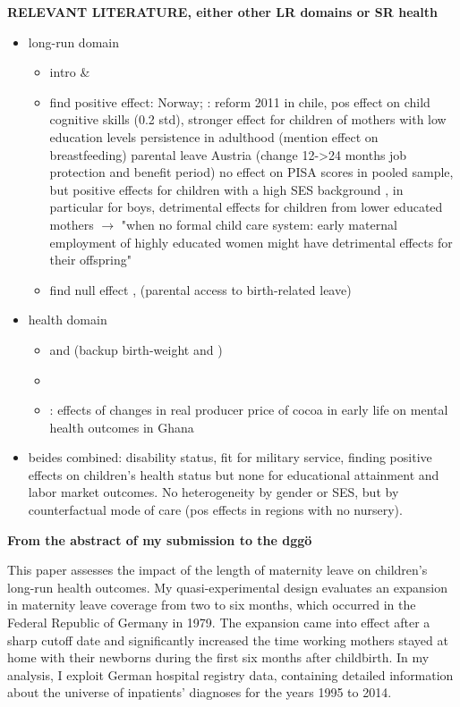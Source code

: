 \documentclass[11pt, a4paper,draft]{article} %
\begin{document}
\textbf{RELEVANT LITERATURE, either other LR domains or SR health} 
\begin{itemize}
	\item long-run domain
	\begin{itemize}
		\item intro \cite{currie2011human} \& \cite{almond2017childhood}
		\item find positive effect: \cite{carneiro2015flying} Norway; \cite{albagli2018}: reform 2011 in chile, pos effect on child cognitive skills (0.2 std), stronger effect for children of mothers with low education levels persistence in adulthood (mention effect on breastfeeding) \cite{danzer2017} parental leave Austria (change 12->24 months job protection and benefit period) no effect on PISA scores in pooled sample, but positive effects for children with a high SES background , in particular for boys, detrimental effects for children from lower educated mothers $\rightarrow$ "when no formal child care system: early maternal employment of highly educated women might have detrimental effects for their offspring"
		\item find null effect \cite{Dahl2016Case}, \cite{rasmussen2010increasing} (parental access to birth-related leave)
	\end{itemize}
	\item health domain
	\begin{itemize}
		\item \cite{stearns2015effects} and \cite{rossin2011effects} (backup birth-weight \cite{almond2005costs} and \cite{currie2007biology})
		\item \cite{beuchert2016}
		\item \cite{adhvaryu2018early}: effects of changes in real producer price of cocoa in early life on mental health outcomes in Ghana
	\end{itemize}
	\item beides combined: \cite{danzer2017parental} disability status, fit for military service, finding positive effects on children's health status but none for educational attainment and labor market outcomes. No heterogeneity by gender or SES, but by counterfactual mode of care (pos effects in regions with no nursery).
\end{itemize}

\newpage 
\textbf{From the abstract of my submission to the dggö}

This paper assesses the impact of the length of maternity leave on children’s long-run health outcomes. My quasi-experimental design evaluates an expansion in maternity leave coverage from two to six months, which occurred in the Federal Republic of Germany in 1979. The expansion came into effect after a sharp cutoff date and significantly increased the time working mothers stayed at home with their newborns during the first six months after childbirth. In my analysis, I exploit German hospital registry data, containing detailed information about the universe of inpatients' diagnoses for the years 1995 to 2014. \newline
\end{document}
